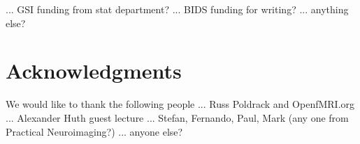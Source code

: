 ... GSI funding from stat department?
... BIDS funding for writing?
... anything else?

\section*{Acknowledgments}
We would like to thank the following people
... Russ Poldrack and OpenfMRI.org
... Alexander Huth guest lecture
... Stefan, Fernando, Paul, Mark (any one from Practical Neuroimaging?)
... anyone else? 



